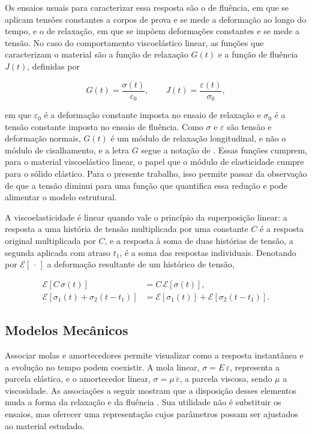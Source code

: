 \documentclass[arial,centeredequations,english,brazilian,oneside,section=TITLE]{ifes8}
\begin{document}
Os ensaios usuais para caracterizar essa resposta são o de fluência, em que se aplicam
tensões constantes a corpos de prova e se mede a deformação ao longo do tempo, e o de
relaxação, em que se impõem deformações constantes e se mede a tensão.
No caso do comportamento viscoelástico linear, as funções que caracterizam o material
são a função de relaxação $G(t)$ e a função de fluência $J(t)$, definidas por

\begin{equation}
  \label{eq:ve-G-J}
  G(t) = \frac{\sigma(t)}{\varepsilon_0}, \qquad
  J(t) = \frac{\varepsilon(t)}{\sigma_0},
\end{equation}

em que $\varepsilon_0$ é a deformação constante imposta no ensaio de relaxação e
$\sigma_0$ é a tensão constante imposta no ensaio de fluência. Como $\sigma$ e $\varepsilon$ são tensão e deformação normais, $G(t)$ é um módulo de
relaxação longitudinal, e não o módulo de cisalhamento, e a letra $G$ segue a notação de
. Essas funções cumprem,
para o material viscoelástico linear, o papel que o módulo de elasticidade cumpre para o
sólido elástico. Para o presente trabalho, isso permite passar da observação de que
a tensão diminui para uma função que quantifica essa redução e pode alimentar
o modelo estrutural.

A viscoelasticidade é linear quando vale o princípio da superposição linear: a resposta
a uma história de tensão multiplicada por uma constante $C$ é a resposta original
multiplicada por $C$, e a resposta à soma de duas histórias de tensão, a segunda
aplicada com atraso $t_1$, é a soma das respostas individuais.
Denotando por $\mathcal{E}[\,\cdot\,]$ a deformação resultante de um histórico de tensão,

\begin{align}
  \mathcal{E}\left[C\,\sigma(t)\right] &= C\,\mathcal{E}\left[\sigma(t)\right],
    \label{eq:ve-superposicao}\\
  \mathcal{E}\left[\sigma_1(t) + \sigma_2(t - t_1)\right]
  &= \mathcal{E}\left[\sigma_1(t)\right] + \mathcal{E}\left[\sigma_2(t - t_1)\right].
\end{align}

\subsection{Modelos Mecânicos}
\label{sub:modelos-mecanicos}

Associar molas e amortecedores permite visualizar como a resposta instantânea e a
evolução no tempo podem coexistir. A mola linear, $\sigma=E\,\varepsilon$,
representa a parcela elástica, e o amortecedor linear,
$\sigma=\mu\,\dot{\varepsilon}$, a parcela viscosa, sendo $\mu$ a viscosidade.
As associações a seguir mostram que a disposição desses elementos muda a forma
da relaxação e da fluência \cite{Pagliosa2004}. Sua utilidade não é substituir
os ensaios, mas oferecer uma representação cujos parâmetros possam ser ajustados
ao material estudado.
\end{document}
